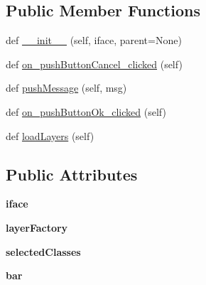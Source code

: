 \subsection*{Public Member Functions}
\begin{DoxyCompactItemize}
\item 
def \mbox{\hyperlink{class_dsg_tools_1_1_layer_tools_1_1load_aux_struct_1_1_load_aux_struct_a05292caf1fd2062a9366f5a80a676747}{\+\_\+\+\_\+init\+\_\+\+\_\+}} (self, iface, parent=None)
\item 
def \mbox{\hyperlink{class_dsg_tools_1_1_layer_tools_1_1load_aux_struct_1_1_load_aux_struct_a2e6d4dc34a49256e227cc9c0d397885d}{on\+\_\+push\+Button\+Cancel\+\_\+clicked}} (self)
\item 
def \mbox{\hyperlink{class_dsg_tools_1_1_layer_tools_1_1load_aux_struct_1_1_load_aux_struct_ae6bbe53e9fa99df9dd668fbbba6e3965}{push\+Message}} (self, msg)
\item 
def \mbox{\hyperlink{class_dsg_tools_1_1_layer_tools_1_1load_aux_struct_1_1_load_aux_struct_acc999a7f0cec20f818c5de952ea5ba0b}{on\+\_\+push\+Button\+Ok\+\_\+clicked}} (self)
\item 
def \mbox{\hyperlink{class_dsg_tools_1_1_layer_tools_1_1load_aux_struct_1_1_load_aux_struct_af010d9291b14d73ddecdeb976e90726b}{load\+Layers}} (self)
\end{DoxyCompactItemize}
\subsection*{Public Attributes}
\begin{DoxyCompactItemize}
\item 
\mbox{\label{class_dsg_tools_1_1_layer_tools_1_1load_aux_struct_1_1_load_aux_struct_afd00b5ad92bcea2338f359ec9e1ad70a}} 
{\bfseries iface}
\item 
\mbox{\label{class_dsg_tools_1_1_layer_tools_1_1load_aux_struct_1_1_load_aux_struct_ae6b86da65bd82b09b94e23064d05e1ad}} 
{\bfseries layer\+Factory}
\item 
\mbox{\label{class_dsg_tools_1_1_layer_tools_1_1load_aux_struct_1_1_load_aux_struct_aa2217ad0460df97eef6fadb32b6c5e65}} 
{\bfseries selected\+Classes}
\item 
\mbox{\label{class_dsg_tools_1_1_layer_tools_1_1load_aux_struct_1_1_load_aux_struct_a2d9ed787f6ecd5625d68e6407504d740}} 
{\bfseries bar}
\end{DoxyCompactItemize}


